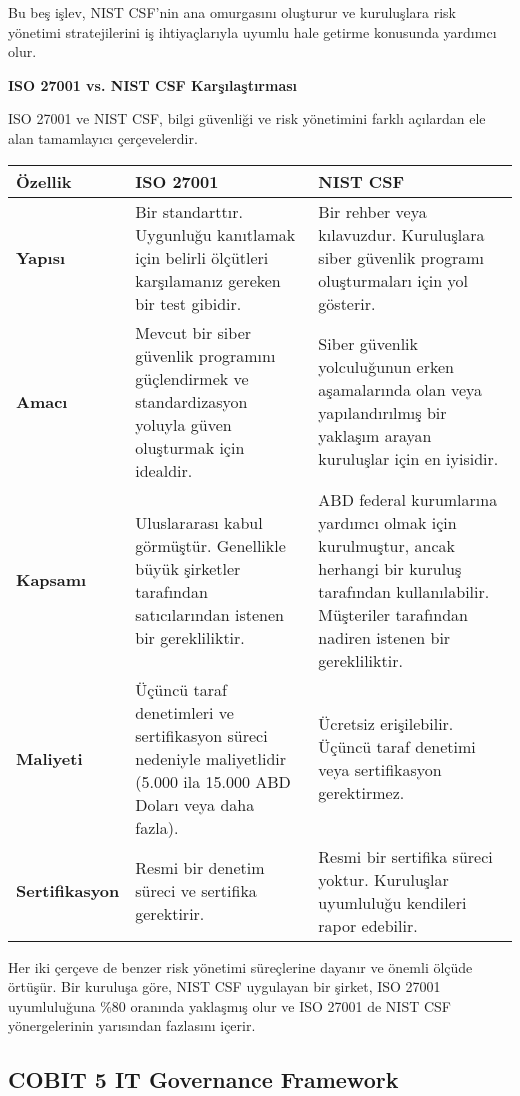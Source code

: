 Bu beş işlev, NIST CSF'nin ana omurgasını oluşturur ve kuruluşlara risk yönetimi stratejilerini iş ihtiyaçlarıyla uyumlu hale getirme konusunda yardımcı olur.

\textbf{ISO 27001 vs. NIST CSF Karşılaştırması}

ISO 27001 ve NIST CSF, bilgi güvenliği ve risk yönetimini farklı açılardan ele alan tamamlayıcı çerçevelerdir.

\begin{adjustbox}{max width=\textwidth}
\begin{tabularx}{\textwidth}{|l|X|X|}
\hline
\textbf{Özellik} & \textbf{ISO 27001} & \textbf{NIST CSF} \\
\hline
\textbf{Yapısı} & Bir standarttır. Uygunluğu kanıtlamak için belirli ölçütleri karşılamanız gereken bir test gibidir. & Bir rehber veya kılavuzdur. Kuruluşlara siber güvenlik programı oluşturmaları için yol gösterir. \\
\hline
\textbf{Amacı} & Mevcut bir siber güvenlik programını güçlendirmek ve standardizasyon yoluyla güven oluşturmak için idealdir. & Siber güvenlik yolculuğunun erken aşamalarında olan veya yapılandırılmış bir yaklaşım arayan kuruluşlar için en iyisidir. \\
\hline
\textbf{Kapsamı} & Uluslararası kabul görmüştür. Genellikle büyük şirketler tarafından satıcılarından istenen bir gerekliliktir. & ABD federal kurumlarına yardımcı olmak için kurulmuştur, ancak herhangi bir kuruluş tarafından kullanılabilir. Müşteriler tarafından nadiren istenen bir gerekliliktir. \\
\hline
\textbf{Maliyeti} & Üçüncü taraf denetimleri ve sertifikasyon süreci nedeniyle maliyetlidir (5.000 ila 15.000 ABD Doları veya daha fazla). & Ücretsiz erişilebilir. Üçüncü taraf denetimi veya sertifikasyon gerektirmez. \\
\hline
\textbf{Sertifikasyon} & Resmi bir denetim süreci ve sertifika gerektirir. & Resmi bir sertifika süreci yoktur. Kuruluşlar uyumluluğu kendileri rapor edebilir. \\
\hline
\end{tabularx}
\end{adjustbox}

Her iki çerçeve de benzer risk yönetimi süreçlerine dayanır ve önemli ölçüde örtüşür. Bir kuruluşa göre, NIST CSF uygulayan bir şirket, ISO 27001 uyumluluğuna \%80 oranında yaklaşmış olur ve ISO 27001 de NIST CSF yönergelerinin yarısından fazlasını içerir.

\subsection{COBIT 5 IT Governance Framework}

